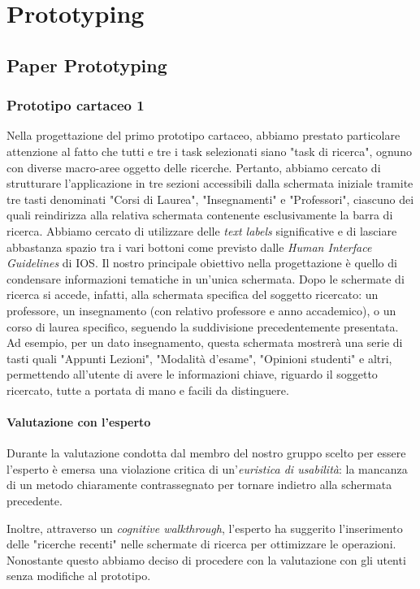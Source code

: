 \chapter{Prototyping}

\section{Paper Prototyping}

\subsection{Prototipo cartaceo 1}
Nella progettazione del primo prototipo cartaceo, abbiamo prestato particolare attenzione al fatto che tutti e tre i task selezionati
siano "task di ricerca", ognuno con diverse macro-aree oggetto delle ricerche. Pertanto, abbiamo cercato di strutturare l'applicazione
in tre sezioni accessibili dalla schermata iniziale tramite tre tasti denominati "Corsi di Laurea", "Insegnamenti" e "Professori", ciascuno
dei quali reindirizza alla relativa schermata contenente esclusivamente la barra di ricerca. 
Abbiamo cercato di utilizzare delle \textit{text labels} significative e di lasciare abbastanza spazio tra i vari bottoni come previsto dalle \textit{Human Interface Guidelines} di IOS.
Il nostro principale obiettivo nella progettazione è quello di condensare informazioni tematiche in un'unica schermata. Dopo le schermate
di ricerca si accede, infatti, alla schermata specifica del soggetto ricercato: un professore, un insegnamento (con relativo professore e
anno accademico), o un corso di laurea specifico, seguendo la suddivisione precedentemente presentata. Ad esempio, per un dato insegnamento,
questa schermata mostrerà una serie di tasti quali "Appunti Lezioni", "Modalità d'esame", "Opinioni studenti" e altri, permettendo all'utente
di avere le informazioni chiave, riguardo il soggetto ricercato, tutte a portata di mano e facili da distinguere.


\subsubsection{Valutazione con l'esperto}
Durante la valutazione condotta dal membro del nostro gruppo scelto per essere l'esperto è emersa una violazione critica di un'\textit{euristica di
usabilità}: la mancanza di un metodo chiaramente contrassegnato per tornare indietro alla schermata precedente.

Inoltre, attraverso un \textit{cognitive walkthrough}, l'esperto ha suggerito l'inserimento delle "ricerche recenti" nelle schermate di ricerca per ottimizzare le operazioni.
Nonostante questo abbiamo deciso di procedere con la valutazione con gli utenti senza modifiche al prototipo.



